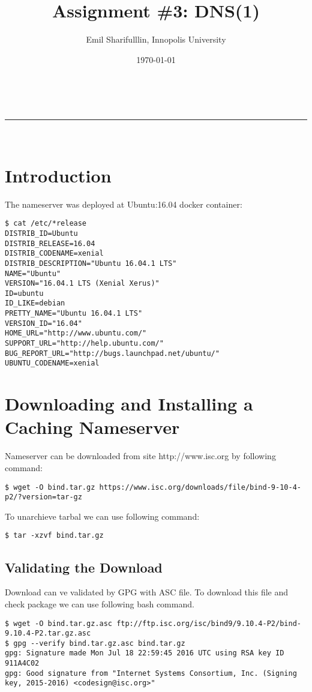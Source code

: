 \documentclass[a4paper,11pt]{article}
\makeatletter
\newcommand*{\TitleFont}{%
      \usefont{\encodingdefault}{\rmdefault}{b}{n}%
      \fontsize{16}{20}%
      \selectfont}
\newcommand{\linia}{\rule{\linewidth}{0.5pt}}
\theoremstyle{mytheor}
\renewcommand{\maketitle}{
\begin{center}
\vspace{2ex}
{\huge \textsc{\@title}}
\vspace{1ex}
\\
\linia\\
\@author \hfill \@date
\vspace{4ex}
\end{center}
}
\makeatother
\begin{document}
\title{\TitleFont Assignment \#3: DNS(1) }

\author{Emil Sharifulllin, Innopolis University}

\date{\today}

\maketitle

\section{Introduction}
The nameserver was deployed at Ubuntu:16.04 docker container: 

\begin{lstlisting}
$ cat /etc/*release
DISTRIB_ID=Ubuntu
DISTRIB_RELEASE=16.04
DISTRIB_CODENAME=xenial
DISTRIB_DESCRIPTION="Ubuntu 16.04.1 LTS"
NAME="Ubuntu"
VERSION="16.04.1 LTS (Xenial Xerus)"
ID=ubuntu
ID_LIKE=debian
PRETTY_NAME="Ubuntu 16.04.1 LTS"
VERSION_ID="16.04"
HOME_URL="http://www.ubuntu.com/"
SUPPORT_URL="http://help.ubuntu.com/"
BUG_REPORT_URL="http://bugs.launchpad.net/ubuntu/"
UBUNTU_CODENAME=xenial
\end{lstlisting}


\section{Downloading and Installing a Caching Nameserver}
Nameserver can be downloaded from site http://www.isc.org by following command:
\begin{lstlisting}
$ wget -O bind.tar.gz https://www.isc.org/downloads/file/bind-9-10-4-p2/?version=tar-gz
\end{lstlisting}

To unarchieve tarbal we can use following command:
\begin{lstlisting}
$ tar -xzvf bind.tar.gz
\end{lstlisting}

\subsection{Validating the Download}
Download can ve validated by GPG with ASC file. To download this file and check package we can use following bash command.

\begin{lstlisting}
$ wget -O bind.tar.gz.asc ftp://ftp.isc.org/isc/bind9/9.10.4-P2/bind-9.10.4-P2.tar.gz.asc
$ gpg --verify bind.tar.gz.asc bind.tar.gz
gpg: Signature made Mon Jul 18 22:59:45 2016 UTC using RSA key ID 911A4C02
gpg: Good signature from "Internet Systems Consortium, Inc. (Signing key, 2015-2016) <codesign@isc.org>"
\end{lstlisting}
\end{document}
